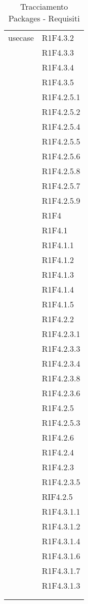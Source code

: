 \begin{center}
\begin{longtable}{|p{7cm}|p{7cm}|}
		usecase & R1F4.3.2 \\ & R1F4.3.3 \\ & R1F4.3.4 \\ & R1F4.3.5 \\ & R1F4.2.5.1 \\ & R1F4.2.5.2 \\ & R1F4.2.5.4 \\ & R1F4.2.5.5 \\ & R1F4.2.5.6 \\ & R1F4.2.5.8 \\ & R1F4.2.5.7 \\ & R1F4.2.5.9 \\ & R1F4 \\ & R1F4.1 \\ & R1F4.1.1 \\ & R1F4.1.2 \\ & R1F4.1.3 \\ & R1F4.1.4 \\ & R1F4.1.5 \\ & R1F4.2.2 \\ & R1F4.2.3.1 \\ & R1F4.2.3.3 \\ & R1F4.2.3.4 \\ & R1F4.2.3.8 \\ & R1F4.2.3.6 \\ & R1F4.2.5 \\ & R1F4.2.5.3 \\ & R1F4.2.6 \\ & R1F4.2.4 \\ & R1F4.2.3 \\ & R1F4.2.3.5 \\ & RIF4.2.5 \\ & R1F4.3.1.1 \\ & R1F4.3.1.2 \\ & R1F4.3.1.4 \\ & R1F4.3.1.6 \\ & R1F4.3.1.7 \\ & R1F4.3.1.3 \\ & \\ \hline
	\caption[Tracciamento Packages - Requisiti]{Tracciamento Packages - Requisiti}
	\label{tabella: Tracciamento Packages - Requisiti}
	\end{longtable}
\end{center}
